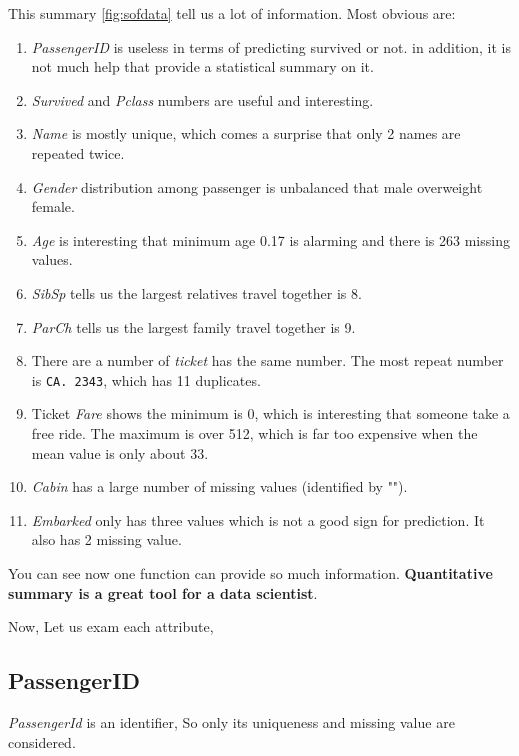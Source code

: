 \documentclass[
]{book}
\providecommand{\tightlist}{%
  \setlength{\itemsep}{0pt}\setlength{\parskip}{0pt}}
\begin{document}
This summary \ref{fig:sofdata} tell us a lot of information. Most obvious are:

\begin{enumerate}
\def\labelenumi{\arabic{enumi}.}
\tightlist
\item
  \emph{PassengerID} is useless in terms of predicting survived or not. in addition, it is not much help that provide a statistical summary on it.
\item
  \emph{Survived} and \emph{Pclass} numbers are useful and interesting.
\item
  \emph{Name} is mostly unique, which comes a surprise that only 2 names are repeated twice.
\item
  \emph{Gender} distribution among passenger is unbalanced that male overweight female.
\item
  \emph{Age} is interesting that minimum age 0.17 is alarming and there is 263 missing values.
\item
  \emph{SibSp} tells us the largest relatives travel together is 8.
\item
  \emph{ParCh} tells us the largest family travel together is 9.
\item
  There are a number of \emph{ticket} has the same number. The most repeat number is \texttt{CA.\ 2343}, which has 11 duplicates.
\item
  Ticket \emph{Fare} shows the minimum is 0, which is interesting that someone take a free ride. The maximum is over 512, which is far too expensive when the mean value is only about 33.
\item
  \emph{Cabin} has a large number of missing values (identified by "").
\item
  \emph{Embarked} only has three values which is not a good sign for prediction. It also has 2 missing value.
\end{enumerate}

You can see now one function can provide so much information. \textbf{Quantitative summary is a great tool for a data scientist}.

Now, Let us exam each attribute,

\hypertarget{passengerid}{%
\subsection*{PassengerID}\label{passengerid}}


\emph{PassengerId} is an identifier, So only its uniqueness and missing value are considered.
\end{document}
